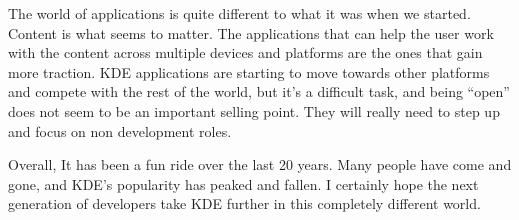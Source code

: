 The world of applications is quite different to what it was when we started. Content is what seems to matter. The applications that can help the user work with the content across multiple devices and platforms are the ones that gain more traction. KDE applications are starting to move towards other platforms and compete with the rest of the world, but it’s a difficult task, and being “open” does not seem to be an important selling point. They will really need to step up and focus on non development roles.

Overall, It has been a fun ride over the last 20 years. Many people have come and gone, and KDE’s popularity has peaked and fallen. I certainly hope the next generation of developers take KDE further in this completely different world.
